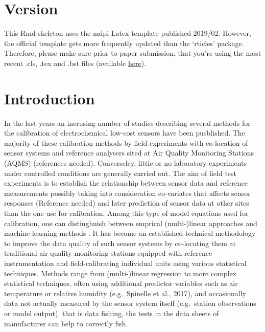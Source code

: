 \documentclass[sensors,article,submit,moreauthors,pdftex]{mdpi}
\begin{document}

\section{Version}\label{version}

This Rmd-skeleton uses the mdpi Latex template published 2019/02.
However, the official template gets more frequently updated than the
`rticles' package. Therefore, please make sure prior to paper
submission, that you're using the most recent .cls, .tex and .bst files
(available \href{http://www.mdpi.com/authors/latex}{here}).

\section{Introduction}\label{introduction}

In the last years an incrusing number of studies describing several
methods for the calibration of electrochemical low-cost sensors have
been pusblished. The majority of these calibration methods by field
experiments with co-location of sensor systems and reference analysers
sited at Air Quality Monitoring Stations (AQMS) (references needed).
Converseley, little or no laboratory experiments under controlled
conditions are generally carried out. The aim of field test experiments
is to establish the relationship between sensor data and reference
measurements possibly taking into consideration co-variates that affects
sensor responses (Reference needed) and later prediction of sensor data
at other sites than the one use for calibration. Among this type of
model equations used for calibration, one can distinghuish between
emprical (multi-)linear approaches \citep{spinelle_field_2015} and
machine learning methods
\citep{de_vito_calibrating_2018, spinelle_field_2015}. It has become an
established technical methodology to improve the data quality of such
sensor systems by co-locating them at traditional air quality monitoring
stations equipped with reference instrumentation and field-calibrating
individual units using various statistical techniques. Methods range
from (multi-)linear regression to more complex statistical techniques,
often using additional predictor variables such as air temperature or
relative humidity (e.g.~Spinelle et al., 2017), and occasionally data
not actually measured by the sensor system itself (e.g.~station
observations or model output). that is data fishing, the tests in the
data sheets of manufacturer can help to correctly fish.
\end{document}
